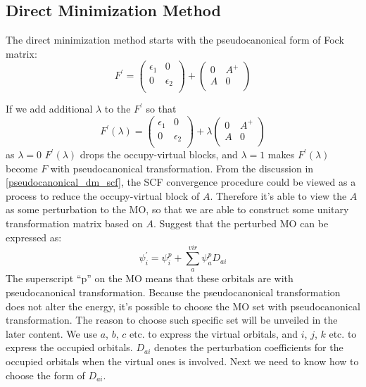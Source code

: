 \subsection{Direct Minimization Method}
%
%
%
The direct minimization method starts with the pseudocanonical form of 
Fock matrix:
\begin{equation}\label{DM_SCF_eq:5}
 F^{'} = 
 \begin{pmatrix}
 \epsilon_{1}    &  0    \\
 0               &  \epsilon_{2}\\
\end{pmatrix}
+
 \begin{pmatrix}
 0    &  A^{+}    \\
 A    &  0        \\
\end{pmatrix}
\end{equation}

If we add additional $\lambda$ to the $F^{'}$ so that
\begin{equation}\label{DM_SCF_eq:6}
 F^{'}(\lambda) = 
 \begin{pmatrix}
 \epsilon_{1}    &  0    \\
 0               &  \epsilon_{2}\\
\end{pmatrix}
+ \lambda
 \begin{pmatrix}
 0    &  A^{+}    \\
 A    &  0        \\
\end{pmatrix}
\end{equation}
as $\lambda = 0$ $F^{'}(\lambda)$ drops the occupy-virtual blocks, and $\lambda = 1$
makes $F^{'}(\lambda)$ become $F$ with pseudocanonical transformation. From the discussion
in \ref{pseudocanonical_dm_scf}, the SCF convergence procedure could be viewed as a process
to reduce the occupy-virtual block of $A$. Therefore it's able to view the $A$ as some 
perturbation to the MO, so that we are able to construct some unitary transformation matrix
based on $A$. Suggest that the perturbed MO can be expressed as:
\begin{equation}\label{DM_SCF_eq:7}
 \psi_{i}^{'} = \psi_{i}^{p} + \sum^{vir}_{a}\psi_{a}^{p}D_{ai}
\end{equation}
The superscript ``p'' on the MO means that these orbitals are with pseudocanonical transformation.
Because the pseudocanonical transformation does not alter the energy, it's possible to choose
the MO set with pseudocanonical transformation. The reason to choose such specific set will 
be unveiled in the later content. We use $a$, $b$, $c$ etc. to express the virtual orbitals, 
and $i$, $j$, $k$ etc. to express the occupied orbitals. $D_{ai}$ denotes the perturbation 
coefficients for the occupied orbitals when the virtual ones is involved. Next we need to
know how to choose the form of $D_{ai}$. 

